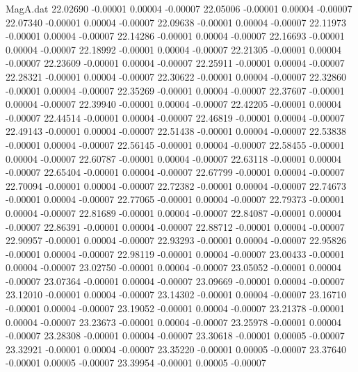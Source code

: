 \begin{filecontents}{MagA.dat}
  22.02690   -0.00001    0.00004   -0.00007
  22.05006   -0.00001    0.00004   -0.00007
  22.07340   -0.00001    0.00004   -0.00007
  22.09638   -0.00001    0.00004   -0.00007
  22.11973   -0.00001    0.00004   -0.00007
  22.14286   -0.00001    0.00004   -0.00007
  22.16693   -0.00001    0.00004   -0.00007
  22.18992   -0.00001    0.00004   -0.00007
  22.21305   -0.00001    0.00004   -0.00007
  22.23609   -0.00001    0.00004   -0.00007
  22.25911   -0.00001    0.00004   -0.00007
  22.28321   -0.00001    0.00004   -0.00007
  22.30622   -0.00001    0.00004   -0.00007
  22.32860   -0.00001    0.00004   -0.00007
  22.35269   -0.00001    0.00004   -0.00007
  22.37607   -0.00001    0.00004   -0.00007
  22.39940   -0.00001    0.00004   -0.00007
  22.42205   -0.00001    0.00004   -0.00007
  22.44514   -0.00001    0.00004   -0.00007
  22.46819   -0.00001    0.00004   -0.00007
  22.49143   -0.00001    0.00004   -0.00007
  22.51438   -0.00001    0.00004   -0.00007
  22.53838   -0.00001    0.00004   -0.00007
  22.56145   -0.00001    0.00004   -0.00007
  22.58455   -0.00001    0.00004   -0.00007
  22.60787   -0.00001    0.00004   -0.00007
  22.63118   -0.00001    0.00004   -0.00007
  22.65404   -0.00001    0.00004   -0.00007
  22.67799   -0.00001    0.00004   -0.00007
  22.70094   -0.00001    0.00004   -0.00007
  22.72382   -0.00001    0.00004   -0.00007
  22.74673   -0.00001    0.00004   -0.00007
  22.77065   -0.00001    0.00004   -0.00007
  22.79373   -0.00001    0.00004   -0.00007
  22.81689   -0.00001    0.00004   -0.00007
  22.84087   -0.00001    0.00004   -0.00007
  22.86391   -0.00001    0.00004   -0.00007
  22.88712   -0.00001    0.00004   -0.00007
  22.90957   -0.00001    0.00004   -0.00007
  22.93293   -0.00001    0.00004   -0.00007
  22.95826   -0.00001    0.00004   -0.00007
  22.98119   -0.00001    0.00004   -0.00007
  23.00433   -0.00001    0.00004   -0.00007
  23.02750   -0.00001    0.00004   -0.00007
  23.05052   -0.00001    0.00004   -0.00007
  23.07364   -0.00001    0.00004   -0.00007
  23.09669   -0.00001    0.00004   -0.00007
  23.12010   -0.00001    0.00004   -0.00007
  23.14302   -0.00001    0.00004   -0.00007
  23.16710   -0.00001    0.00004   -0.00007
  23.19052   -0.00001    0.00004   -0.00007
  23.21378   -0.00001    0.00004   -0.00007
  23.23673   -0.00001    0.00004   -0.00007
  23.25978   -0.00001    0.00004   -0.00007
  23.28308   -0.00001    0.00004   -0.00007
  23.30618   -0.00001    0.00005   -0.00007
  23.32921   -0.00001    0.00004   -0.00007
  23.35220   -0.00001    0.00005   -0.00007
  23.37640   -0.00001    0.00005   -0.00007
  23.39954   -0.00001    0.00005   -0.00007

\end{filecontents}
